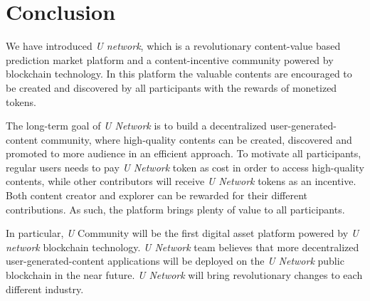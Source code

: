 \chapter{Conclusion}

We have introduced \emph{U network}, which is a revolutionary content-value based prediction market platform and a content-incentive community powered by blockchain technology. In this platform the valuable contents are encouraged to be created and discovered by all participants with the rewards of monetized tokens.  

The long-term goal of \emph{U Network} is to build a decentralized user-generated-content community, where high-quality contents can be created, discovered and promoted to more audience in an efficient approach. To motivate all participants, regular users needs to pay \emph{U Network} token as cost in order to access high-quality contents, while other contributors will receive \emph{U Network} tokens as an incentive. Both content creator and explorer can be rewarded for their different contributions. As such, the platform brings plenty of value to all participants. 

In particular, \emph{U} Community will be the first digital asset platform powered by \emph{U network} blockchain technology. \emph{U Network} team believes that more decentralized user-generated-content applications will be deployed on the \emph{U Network} public blockchain in the near future. \emph{U Network} will bring revolutionary changes to each different industry.





